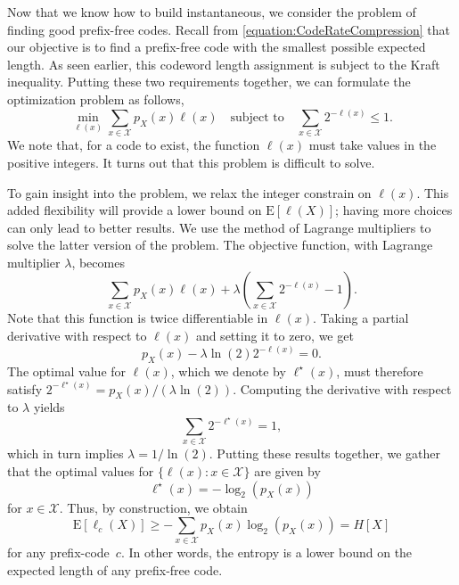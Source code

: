 Now that we know how to build instantaneous, we consider the problem of finding good prefix-free codes.
Recall from \eqref{equation:CodeRateCompression} that our objective is to find a prefix-free code with the smallest possible expected length.
As seen earlier, this codeword length assignment is subject to the Kraft inequality.
Putting these two requirements together, we can formulate the optimization problem as follows,
\begin{equation*}
\min_{\ell(x)} \sum_{x \in \mathcal{X}} p_X(x) \ell(x)
\quad \text{subject to} \quad
\sum_{x \in \mathcal{X}} 2^{- \ell(x)} \leq 1 .
\end{equation*}
We note that, for a code to exist, the function $\ell(x)$ must take values in the positive integers.
It turns out that this problem is difficult to solve.

To gain insight into the problem, we relax the integer constrain on $\ell(x)$.
This added flexibility will provide a lower bound on $\mathrm{E} [\ell(X)]$; having more choices can only lead to better results.
We use the method of Lagrange multipliers to solve the latter version of the problem.
The objective function, with Lagrange multiplier $\lambda$, becomes
\begin{equation*}
\sum_{x \in \mathcal{X}} p_X(x) \ell(x)
+ \lambda \left( \sum_{x \in \mathcal{X}} 2^{- \ell(x)} - 1 \right) .
\end{equation*}
Note that this function is twice differentiable in $\ell(x)$.
Taking a partial derivative with respect to $\ell(x)$ and setting it to zero, we get
\begin{equation*}
p_X(x) - \lambda \ln(2) 2^{- \ell(x)}  = 0 .
\end{equation*}
The optimal value for $\ell(x)$, which we denote by $\ell^{\star}(x)$, must therefore satisfy $2^{- \ell^{\star}(x)} = p_X(x) / (\lambda \ln (2))$.
Computing the derivative with respect to $\lambda$ yields
\begin{equation*}
\sum_{x \in \mathcal{X}} 2^{- \ell^{\star}(x)} = 1 ,
\end{equation*}
which in turn implies $\lambda = 1 / \ln (2)$.
Putting these results together, we gather that the optimal values for $\{ \ell(x) : x \in \mathcal{X} \}$ are given by
\begin{equation*}
\ell^{\star}(x) = - \log_2 (p_X(x))
\end{equation*}
for $x \in \mathcal{X}$.
Thus, by construction, we obtain
\begin{equation*}
\mathrm{E} [\ell_c(X)] \geq - \sum_{x \in \mathcal{X}} p_X(x) \log_2 (p_X(x))
= H[X]
\end{equation*}
for any prefix-code~$c$.
In other words, the entropy is a lower bound on the expected length of any prefix-free code.

